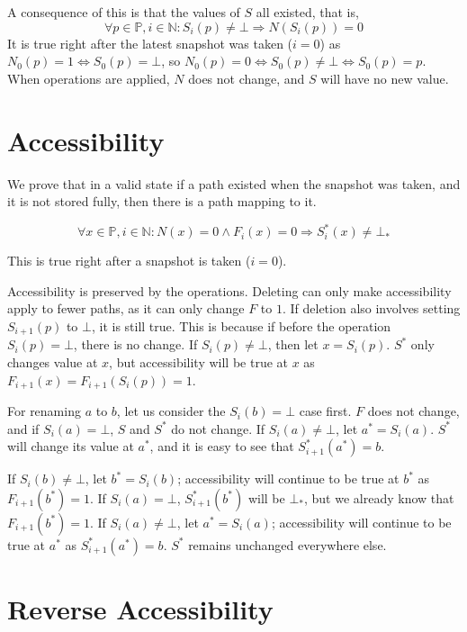 \documentclass[12pt]{article}
\newcommand{\bdt}{\bot\!_*}
\newcommand{\setp}{\mathbb{P}}
\newcommand{\setn}{\mathbb{N}}
\begin{document}
A consequence of this is that the values of $S$ all existed, that is,
\begin{equation}
\forall p\in\setp, i\in\setn: S_i(p)\neq\bot \Rightarrow N(S_i(p)) = 0
\end{equation}
It is true right after the latest snapshot was taken ($i=0$) as
$N_0(p)=1 \Leftrightarrow S_0(p)=\bot$, so
$N_0(p)=0 \Leftrightarrow S_0(p)\neq\bot \Leftrightarrow S_0(p)=p$.
When operations are applied, $N$ does not change, and $S$ will have no new value.

\section{Accessibility}

We prove that in a valid state if a path existed when the snapshot was taken, and it is not stored fully,
then there is a path mapping to it.

\begin{equation}
\forall x\in\setp,i\in\setn:
N(x)=0 \wedge F_i(x)=0 \Rightarrow S^*_i(x) \neq \bdt
\end{equation}

This is true right after a snapshot is taken ($i=0$).

Accessibility is preserved by the operations. Deleting can only make
accessibility apply to fewer paths, as it can only change $F$ to $1$.
If deletion also involves setting $S_{i+1}(p)$ to $\bot$, it is still true.
This is because if before the operation $S_i(p)=\bot$, there is no change.
If $S_i(p)\neq\bot$, then let $x=S_i(p)$. $S^*$ only changes
value at $x$, but accessibility will be true at $x$ as $F_{i+1}(x)=F_{i+1}(S_i(p))=1$.

For renaming $a$ to $b$, let us consider the $S_i(b)=\bot$ case first.
$F$ does not change, and if $S_i(a)=\bot$, $S$ and $S^*$ do not change.
If $S_i(a)\neq\bot$, let $a^*=S_i(a)$. $S^*$ will change its value at $a^*$,
and it is easy to see that $S^*_{i+1}(a^*)=b$.

If $S_i(b)\neq\bot$, let $b^*=S_i(b)$; accessibility will continue to be true at
$b^*$ as $F_{i+1}(b^*)=1$. If $S_i(a)=\bot$, $S^*_{i+1}(b^*)$ will be $\bdt$,
but we already know that $F_{i+1}(b^*)=1$.
If $S_i(a)\neq\bot$, let $a^*=S_i(a)$; accessibility will continue to be true at $a^*$
as $S^*_{i+1}(a^*)=b$. $S^*$ remains unchanged everywhere else.

\section{Reverse Accessibility}
\end{document}
